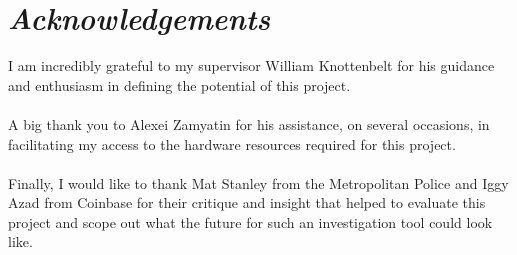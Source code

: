 \chapter*{\textit{Acknowledgements}}

I am incredibly grateful to my supervisor William Knottenbelt for his guidance and enthusiasm in defining the potential of this project. 
\\\\
A big thank you to Alexei Zamyatin for his assistance, on several occasions, in facilitating my access to the hardware resources required for this project. 
\\\\
Finally, I would like to thank Mat Stanley from the Metropolitan Police and Iggy Azad from Coinbase for their critique and insight that helped to evaluate this project and scope out what the future for such an investigation tool could look like.  